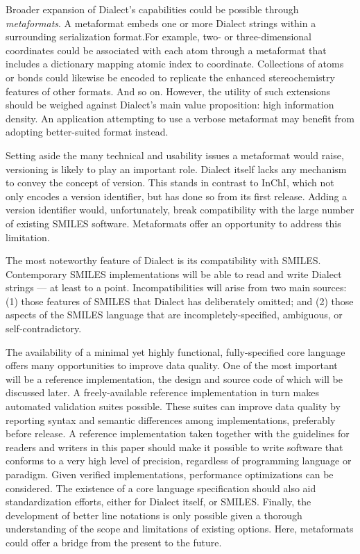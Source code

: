 \documentclass{article}
\begin{document}
Broader expansion of Dialect's capabilities could be possible through \textit{metaformats}. A metaformat embeds one or more Dialect strings within a surrounding serialization format.For example, two- or three-dimensional coordinates could be associated with each atom through a metaformat that includes a dictionary mapping atomic index to coordinate. Collections of atoms or bonds could likewise be encoded to replicate the enhanced stereochemistry features of other formats. And so on. However, the utility of such extensions should be weighed against Dialect's main value proposition: high information density. An application attempting to use a verbose metaformat may benefit from adopting better-suited format instead.

Setting aside the many technical and usability issues a metaformat would raise, versioning is likely to play an important role. Dialect itself lacks any mechanism to convey the concept of version. This stands in contrast to InChI, which not only encodes a version identifier, but has done so from its first release. Adding a version identifier would, unfortunately, break compatibility with the large number of existing SMILES software. Metaformats offer an opportunity to address this limitation.

The most noteworthy feature of Dialect is its compatibility with SMILES. Contemporary SMILES implementations will be able to read and write Dialect strings --- at least to a point. Incompatibilities will arise from two main sources: (1) those features of SMILES that Dialect has deliberately omitted; and (2) those aspects of the SMILES language that are incompletely-specified, ambiguous, or self-contradictory.

The availability of a minimal yet highly functional, fully-specified core language offers many opportunities to improve data quality. One of the most important will be a reference implementation, the design and source code of which will be discussed later. A freely-available reference implementation in turn makes automated validation suites possible. These suites can improve data quality by reporting syntax and semantic differences among implementations, preferably before release. A reference implementation taken together with the guidelines for readers and writers in this paper should make it possible to write software that conforms to a very high level of precision, regardless of programming language or paradigm. Given verified implementations, performance optimizations can be considered. The existence of a core language specification should also aid standardization efforts, either for Dialect itself, or SMILES. Finally, the development of better line notations is only possible given a thorough understanding of the scope and limitations of existing options. Here, metaformats could offer a bridge from the present to the future.
\end{document}
